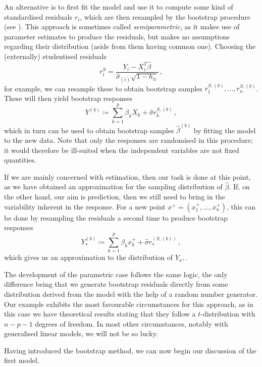 \documentclass[a4paper]{book}
\theoremstyle{plain}
\begin{document}
An alternative is to first fit the model and use it to compute some kind of standardised residuals $r_i$, which are then resampled by the bootstrap procedure (see \cite[Algorithm 6.1]{davison}). This approach is sometimes called \emph{semiparametric}, as it makes use of parameter estimates to produce the residuals, but makes no assumptions regarding their distribution (aside from them having common one). Choosing the (externally) studentised residuals
\begin{equation}
    r^S_i = \frac{Y_i - X^T_i \hat{\beta}}{\hat{\sigma}_{(i)} \sqrt{1 - h_{ii}}} \,,
\end{equation}
for example, we can resample these to obtain bootstrap samples $r^{S, (b)}_1, \dots, r^{S, (b)}_n$. These will then yield bootstrap responses
\begin{equation}
    Y^{(b)} \coloneqq \sum_{k=1}^p \beta_k X_k + \hat{\sigma} r^{S, (b)}_k \,,
\end{equation}
which in turn can be used to obtain bootstrap samples $\hat{\beta}^{(b)}$ by fitting the model to the new data. Note that only the responses are randomised in this procedure; it would therefore be ill-suited when the independent variables are not fixed quantities. 

If we are mainly concerned with estimation, then our task is done at this point, as we have obtained an approximation for the sampling distribution of $\hat{\beta}$. If, on the other hand, our aim is prediction, then we still need to bring in the variability inherent in the response. For a new point $x^+ = (x^+_1, \dots, x^+_n)$, this can be done by resampling the residuals a second time to produce bootstrap responses
\begin{equation}
    Y_*^{(b)} \coloneqq \sum_{k=1}^p \beta_k x^+_k + \hat{\sigma} r_*^{(S, (b))} \,,
\end{equation}
which gives us an approximation to the distribution of $Y_{x^+}$.

The development of the parametric case follows the same logic, the only difference being that we generate bootstrap residuals directly from some distribution derived from the model with the help of a random number generator. Our example exhibits the most favourable circumstances for this approach, as in this case we have theoretical results stating that they follow a $t$-distribution with $n - p - 1$ degrees of freedom. In most other circumstances, notably with generalised linear models, we will not be so lucky.

Having introduced the bootstrap method, we can now begin our discussion of the first model.
\end{document}
